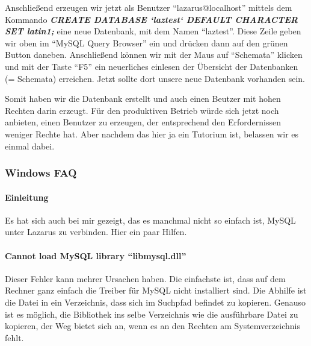 Anschließend erzeugen wir jetzt als Benutzer "`lazarus@localhost"' mittels dem Kommando \textbf{\emph{CREATE DATABASE `laztest` DEFAULT CHARACTER SET latin1;}} eine neue Datenbank, mit dem Namen "`laztest"'. Diese Zeile geben wir oben im "`MySQL Query Browser"' ein und drücken dann auf den grünen Button daneben. Anschließend können wir mit der Maus auf "`Schemata"' klicken und mit der Taste "`F5"' ein neuerliches einlesen der Übersicht der Datenbanken (= Schemata) erreichen. Jetzt sollte dort unsere neue Datenbank vorhanden sein.  

Somit haben wir die Datenbank erstellt und auch einen Beutzer mit hohen Rechten darin erzeugt. Für den produktiven Betrieb würde sich jetzt noch anbieten, einen Benutzer zu erzeugen, der entsprechend den Erfordernissen weniger Rechte hat. Aber nachdem das hier ja ein Tutorium ist, belassen wir es einmal dabei.

\subsubsection{Windows FAQ}
\paragraph{Einleitung}
Es hat sich auch bei mir gezeigt, das es manchmal nicht so einfach ist, MySQL unter Lazarus zu verbinden. Hier ein paar Hilfen.

\paragraph{Cannot load MySQL library "`libmysql.dll"'}
Dieser Fehler kann mehrer Ursachen haben. Die einfachste ist, dass auf dem Rechner ganz einfach die Treiber für MySQL nicht installiert sind. 
\label{fig:FAQWDB01}
Die Abhilfe ist die Datei in ein Verzeichnis, dass sich im Suchpfad befindet zu kopieren. Genauso ist es möglich, die Bibliothek ins selbe Verzeichnis wie die ausführbare Datei zu kopieren, der Weg bietet sich an, wenn es an den Rechten am Systemverzeichnis fehlt.

